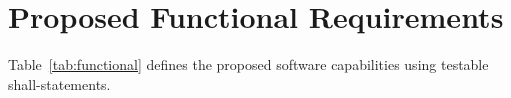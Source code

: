 \documentclass[11pt,a4paper]{report}
\begin{document}

\section{Proposed Functional Requirements}
Table~\ref{tab:functional} defines the proposed software capabilities using testable shall-statements.
\end{document}
